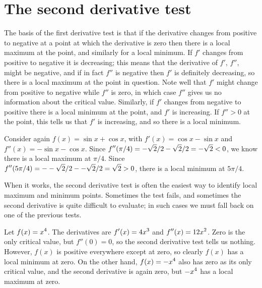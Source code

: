 \section{The second derivative test} {}{}
\nobreak
The basis of the first derivative test is that if the derivative
changes from positive to negative at a point at which the derivative
is zero then there is a local maximum at the point, and similarly for
a local minimum. If $f'$ changes from positive to negative it is
decreasing; this means that the derivative of $f'$, $f''$, might be negative,
and if in fact $f''$ is negative then $f'$ is definitely
decreasing, so there is a local maximum at the point in question. Note
well that $f'$ might change from positive to negative while $f''$ is
zero, in which case $f''$ gives us no information about the critical
value. Similarly, if $f'$ changes from negative to positive there is a
local minimum at the point, and $f'$ is increasing. If $f''>0$ at the
point, this tells us that $f'$ is increasing, and so there is a local
minimum. 

\begin{example}
Consider again $f(x)=\sin x + \cos x$, with $f'(x)=\cos x-\sin x$ and
$ f''(x)=-\sin x -\cos x$. Since $\displaystyle f''(\pi/4)=-\sqrt{2}/2-\sqrt2/2=-\sqrt2<0$,
we know there is a local maximum at $\pi/4$. Since
$\displaystyle f''(5\pi/4)=--\sqrt{2}/2--\sqrt2/2=\sqrt2>0$, there is a local
minimum at $5\pi/4$.
\end{example}

When it works, the second derivative test is often the easiest way to
identify local maximum and minimum points. Sometimes the test fails,
and sometimes the second derivative is quite difficult to evaluate; in
such cases we must fall back on one of the previous tests.

\begin{example}
Let $\displaystyle f(x)=x^4$. The derivatives are $\displaystyle f'(x)=4x^3$ and
$\displaystyle f''(x)=12x^2$. Zero is the only critical value, but $f''(0)=0$, so
the second derivative test tells us nothing. However, $f(x)$ is
positive everywhere except at zero, so clearly $f(x)$ has a local
minimum at zero. On the other hand, $\displaystyle f(x)=-x^4$ also has zero as its
only critical value, and the second derivative is again zero, but
$\displaystyle -x^4$ has a local maximum at zero.
\end{example}

